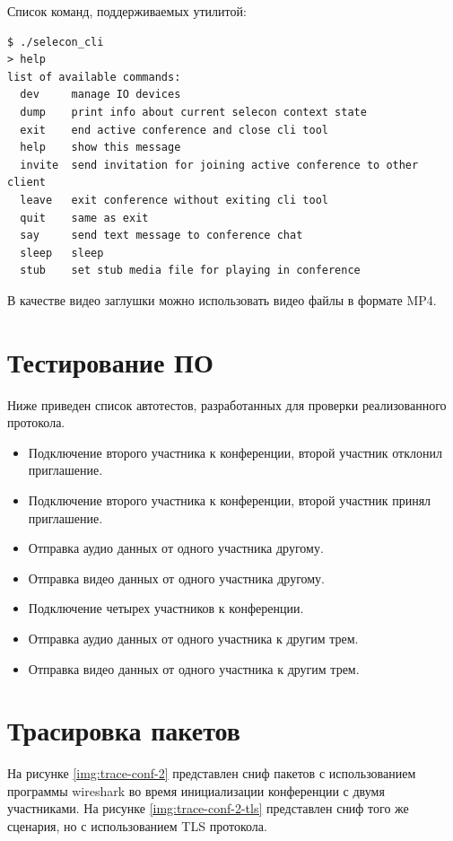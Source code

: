 Список команд, поддерживаемых утилитой:

\begin{verbatim}
$ ./selecon_cli
> help
list of available commands:
  dev     manage IO devices
  dump    print info about current selecon context state
  exit    end active conference and close cli tool
  help    show this message
  invite  send invitation for joining active conference to other client
  leave   exit conference without exiting cli tool
  quit    same as exit
  say     send text message to conference chat
  sleep   sleep
  stub    set stub media file for playing in conference
\end{verbatim}

В качестве видео заглушки можно использовать видео файлы в формате MP4.

\clearpage

\section{Тестирование ПО}

Ниже приведен список автотестов, разработанных для проверки реализованного протокола. 

\begin{itemize}[label=---]
  \item Подключение второго участника к конференции, второй участник отклонил приглашение.
  \item Подключение второго участника к конференции, второй участник принял приглашение.
  \item Отправка аудио данных от одного участника другому.
  \item Отправка видео данных от одного участника другому.
  \item Подключение четырех участников к конференции.
  \item Отправка аудио данных от одного участника к другим трем.
  \item Отправка видео данных от одного участника к другим трем.
\end{itemize}

\section{Трасировка пакетов}

На рисунке \ref{img:trace-conf-2} представлен сниф пакетов с использованием программы wireshark \cite{wireshark} во время инициализации конференции с двумя участниками.
На рисунке \ref{img:trace-conf-2-tls} представлен сниф того же сценария, но с использованием TLS протокола.

